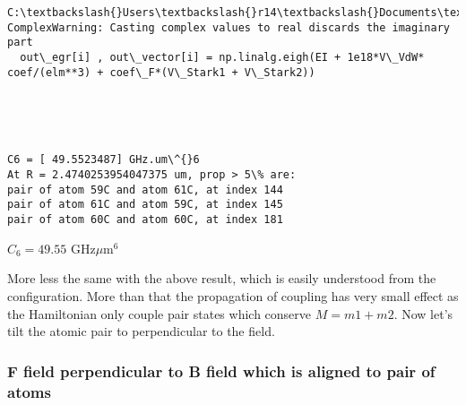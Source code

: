 \documentclass{article}
\begin{document}
    \begin{Verbatim}[commandchars=\\\{\}]
C:\textbackslash{}Users\textbackslash{}r14\textbackslash{}Documents\textbackslash{}GitHub\textbackslash{}test\textbackslash{}python\textbackslash{}cal\_VdW.py:271: ComplexWarning: Casting complex values to real discards the imaginary part
  out\_egr[i] , out\_vector[i] = np.linalg.eigh(EI + 1e18*V\_VdW* coef/(elm**3) + coef\_F*(V\_Stark1 + V\_Stark2))
    \end{Verbatim}

    \begin{center}
    \end{center}
    { \hspace*{\fill} \\}
    
    \begin{center}
    \end{center}
    { \hspace*{\fill} \\}
    
    \begin{Verbatim}[commandchars=\\\{\}]
C6 = [ 49.5523487] GHz.um\^{}6
At R = 2.4740253954047375 um, prop > 5\% are:
pair of atom 59C and atom 61C, at index 144
pair of atom 61C and atom 59C, at index 145
pair of atom 60C and atom 60C, at index 181
    \end{Verbatim}

    \(C_6 = 49.55\) GHz\(\mu\)m\(^6\)

More less the same with the above result, which is easily understood
from the configuration. More than that the propagation of coupling has
very small effect as the Hamiltonian only couple pair states which
conserve \(M = m1 + m2\). Now let's tilt the atomic pair to
perpendicular to the field.

\subsubsection{F field perpendicular to B field which is aligned to pair
of
atoms}\label{f-field-perpendicular-to-b-field-which-is-aligned-to-pair-of-atoms}
\end{document}
